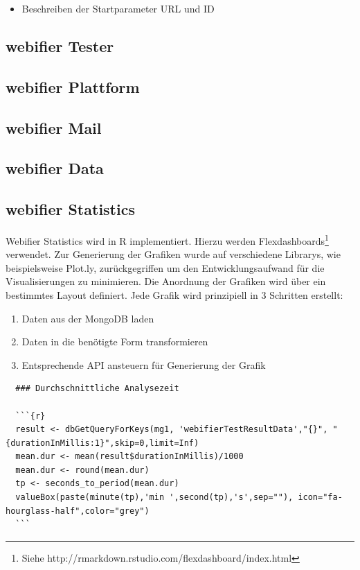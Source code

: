 \begin{itemize}
  \item Beschreiben der Startparameter URL und ID
\end{itemize}

\subsection{webifier Tester}




\subsection{webifier Plattform}


\subsection{webifier Mail}


\subsection{webifier Data}


\subsection{webifier Statistics}
Webifier Statistics wird in R implementiert. Hierzu werden Flexdashboards\footnote{Siehe http://rmarkdown.rstudio.com/flexdashboard/index.html} verwendet. Zur Generierung der Grafiken wurde auf verschiedene Librarys, wie beispielsweise Plot.ly, zurückgegriffen um den Entwicklungsaufwand für die Visualisierungen zu minimieren. Die Anordnung der Grafiken wird über ein bestimmtes Layout definiert. Jede Grafik wird prinzipiell in 3 Schritten erstellt:

\begin{enumerate}
  \item Daten aus der MongoDB laden
  \item Daten in die benötigte Form transformieren
  \item Entsprechende API ansteuern für Generierung der Grafik
\end{enumerate}

\begin{scriptsize}
\begin{lstlisting}
  ### Durchschnittliche Analysezeit

  ```{r}
  result <- dbGetQueryForKeys(mg1, 'webifierTestResultData',"{}", "{durationInMillis:1}",skip=0,limit=Inf)
  mean.dur <- mean(result$durationInMillis)/1000
  mean.dur <- round(mean.dur)
  tp <- seconds_to_period(mean.dur)
  valueBox(paste(minute(tp),'min ',second(tp),'s',sep=""), icon="fa-hourglass-half",color="grey")
  ```
\end{lstlisting}
\end{scriptsize}

